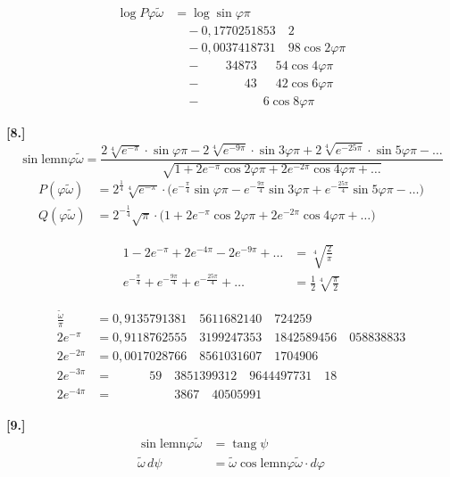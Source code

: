 \documentclass[10pt,a4paper]{article}
\newcommand{\lemn}{\text{lemn}}
\newcommand{\sinlemn}{\sin\lemn}
\newcommand{\coslemn}{\cos\lemn}
\DeclareMathOperator{\tg}{tang}
\begin{document}
\begin{align*}
\log P\varphi\tilde{\omega} &= \log\sin\varphi\pi\\
&\quad - 0{,}1770251853\quad 2\\
&\quad - 0{,}0037418731\quad 98\cos 2\varphi\pi\\
&\quad - \phantom{0{,}00}34873\quad\phantom{0}54\cos 4\varphi\pi\\
&\quad - \phantom{0{,}00000}43\quad\phantom{0}42\cos 6\varphi\pi\\
&\quad - \phantom{0{,}00000000}6\cos 8\varphi\pi
\end{align*}

\medskip
\noindent\textbf{[8.]}
\[
\sinlemn\varphi\tilde{\omega} = \frac{2\sqrt[4]{e^{-\pi}}\cdot\sin\varphi\pi - 2\sqrt[4]{e^{-9\pi}}\cdot\sin 3\varphi\pi + 2\sqrt[4]{e^{-25\pi}}\cdot\sin 5\varphi\pi - \ldots}{\sqrt{1+2e^{-\pi}\cos 2\varphi\pi + 2e^{-2\pi}\cos 4\varphi\pi + \ldots}}
\]
\begin{align*}
P(\varphi\tilde{\omega}) &= 2^{\frac14}\sqrt[4]{e^{-\pi}}\cdot\bigl(e^{-\frac{\pi}{4}}\sin\varphi\pi - e^{-\frac{9\pi}{4}}\sin 3\varphi\pi + e^{-\frac{25\pi}{4}}\sin 5\varphi\pi - \ldots\bigr)\\
Q(\varphi\tilde{\omega}) &= 2^{-\frac14}\sqrt{\pi}\cdot\bigl(1+2e^{-\pi}\cos 2\varphi\pi + 2e^{-2\pi}\cos 4\varphi\pi + \ldots\bigr)
\end{align*}

\begin{align*}
1-2e^{-\pi}+2e^{-4\pi}-2e^{-9\pi}+\ldots &= \sqrt[4]{\tfrac{2}{\pi}}\\
e^{-\frac{\pi}{4}}+e^{-\frac{9\pi}{4}}+e^{-\frac{25\pi}{4}}+\ldots &= \tfrac12\sqrt[4]{\tfrac{\pi}{2}}
\end{align*}

\begin{align*}
\frac{\tilde{\omega}}{\pi} &= 0{,}9135791381\quad 5611682140\quad 724259\\
2e^{-\pi} &= 0{,}9118762555\quad 3199247353\quad 1842589456\quad 058838833\\
2e^{-2\pi} &= 0{,}0017028766\quad 8561031607\quad 1704906\\
2e^{-3\pi} &= \phantom{0{,}0000}59\quad 3851399312\quad 9644497731\quad 18\\
2e^{-4\pi} &= \phantom{0{,}00000000}3867\quad 40505991
\end{align*}

\medskip
\noindent\textbf{[9.]}
\begin{align*}
\sinlemn\varphi\tilde{\omega} &= \tg\psi\\
\tilde{\omega}\,d\psi &= \tilde{\omega}\coslemn\varphi\tilde{\omega}\cdot d\varphi
\end{align*}
\end{document}
